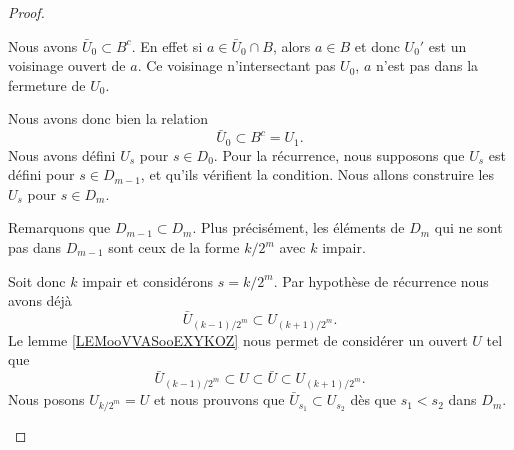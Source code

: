 \begin{proof}
\begin{subproof}
    Nous avons \( \bar U_0\subset B^c\). En effet si \( a\in \bar U_0\cap B\), alors \( a\in B\) et donc \( U_0'\) est un voisinage ouvert de \( a\). Ce voisinage n'intersectant pas \( U_0\), \( a\) n'est pas dans la fermeture de \( U_0\).

    Nous avons donc bien la relation
    \begin{equation}
        \bar U_0\subset B^c=U_1.
    \end{equation}
    \spitem[Récurrence]
    Nous avons défini \( U_s\) pour \( s\in D_0\). Pour la récurrence, nous supposons que \( U_s\) est défini pour \( s\in D_{m-1}\), et qu'ils vérifient la condition. Nous allons construire les \( U_s\) pour \( s\in D_m\).

    Remarquons que \( D_{m-1}\subset D_m\). Plus précisément, les éléments de \( D_m\) qui ne sont pas dans \( D_{m-1} \) sont ceux de la forme \( k/2^m\) avec \( k\) impair.

    Soit donc \( k\) impair et considérons \( s=k/2^m\). Par hypothèse de récurrence nous avons déjà
    \begin{equation}
        \bar U_{(k-1)/2^m}\subset U_{(k+1)/2^m}.
    \end{equation}
    Le lemme \ref{LEMooVVASooEXYKOZ} nous permet de considérer un ouvert \( U\) tel que
    \begin{equation}
        \bar U_{(k-1)/2^m}\subset U\subset \bar U\subset U_{(k+1)/2^m}.
    \end{equation}
    Nous posons \( U_{k/2^m}=U\) et nous prouvons que \( \bar U_{s_1}\subset U_{s_2}\) dès que \( s_1<s_2\) dans \( D_m\).


\end{subproof}
\end{proof}
